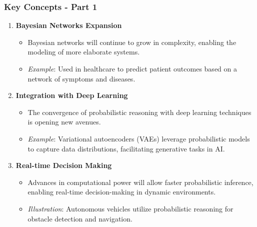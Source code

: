 \documentclass[aspectratio=169]{beamer}
\begin{document}
\begin{frame}[fragile]
    \frametitle{Key Concepts - Part 1}
    \begin{enumerate}
        \item \textbf{Bayesian Networks Expansion}
        \begin{itemize}
            \item Bayesian networks will continue to grow in complexity, enabling the modeling of more elaborate systems.
            \item \textit{Example}: Used in healthcare to predict patient outcomes based on a network of symptoms and diseases.
        \end{itemize}
        
        \item \textbf{Integration with Deep Learning}
        \begin{itemize}
            \item The convergence of probabilistic reasoning with deep learning techniques is opening new avenues.
            \item \textit{Example}: Variational autoencoders (VAEs) leverage probabilistic models to capture data distributions, facilitating generative tasks in AI.
        \end{itemize}
        
        \item \textbf{Real-time Decision Making}
        \begin{itemize}
            \item Advances in computational power will allow faster probabilistic inference, enabling real-time decision-making in dynamic environments.
            \item \textit{Illustration}: Autonomous vehicles utilize probabilistic reasoning for obstacle detection and navigation.
        \end{itemize}
    \end{enumerate}
\end{frame}
\end{document}
